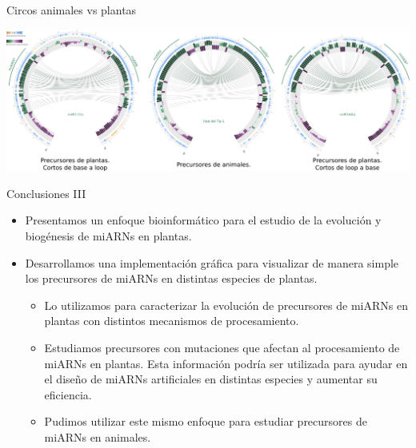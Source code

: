 \documentclass{beamer}
\begin{document}

\begin{frame}{Circos animales vs plantas}
	\begin{center}
		\includegraphics[width=1\textwidth]{img/animals_vs_plants_circos_defensa.png}
	\end{center}
\end{frame}


\begin{frame}{Conclusiones III}
	\begin{itemize}
        \item<1-> Presentamos un enfoque bioinformático para el estudio de la evolución y biogénesis de miARNs en plantas.
        \item<2-> Desarrollamos una implementación gráfica para visualizar de manera simple los precursores de miARNs en distintas especies de plantas.
        
        	\begin{itemize}
			\item<3-> Lo utilizamos para caracterizar la evolución de precursores de miARNs en plantas con distintos mecanismos de procesamiento.
			\item<4-> Estudiamos precursores con mutaciones que afectan al procesamiento de miARNs en plantas. 
			Esta información podría ser utilizada para ayudar en el diseño de miARNs artificiales en distintas especies y aumentar su eficiencia.
			\item<5-> Pudimos utilizar este mismo enfoque para estudiar precursores de miARNs en animales.
		\end{itemize}
	\end{itemize}
\end{frame}
\end{document}
